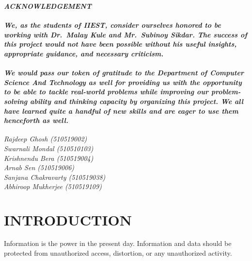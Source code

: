 \documentclass[a4paper]{article}
\begin{document}
\begin{titlepage}
    \begin{center}
        {\Large{\bf{\textit{ACKNOWLEDGEMENT}}\\[2cm]}}
    \end{center}


    \paragraph{\normalfont\textit{\indent We, as the students of IIEST, consider ourselves honored to be working with Dr.\ Malay Kule and Mr.\ Subinoy Sikdar.
            The success of this project would not have been possible without his useful insights,
            appropriate guidance, and necessary criticism.}}
    \paragraph{\normalfont\textit{\indent We would pass our token of gratitude to the Department of Computer Science And Technology as well for providing
            us with the opportunity to be able to tackle real-world problems while improving
            our problem-solving ability and thinking capacity by organizing this project. We all have
            learned quite a handful of new skills and are eager to use them henceforth as well.}}

    \begin{flushleft}
        \textit{Rajdeep Ghosh (510519002)\\
            Swarnali Mondal (510510103)\\
            Krishnendu Bera (510519004)\\
            Arnab Sen (510519006)\\
            Sanjana Chakravarty (510519038)\\
            Abhiroop Mukherjee (510519109)
        }
    \end{flushleft}
\end{titlepage}

\setcounter{page}{1}
\newpage
\setcounter{tocdepth}{2} %
\tableofcontents
{}
\newpage

\setcounter{page}{1}

\section{INTRODUCTION}
Information is the power in the present day. 
Information and data should be protected from 
unauthorized access, distortion, or any 
unauthorized activity. 
\end{document}
